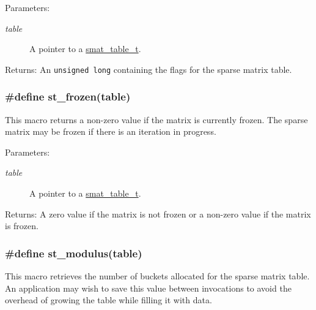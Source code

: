 \begin{Desc}
\item[Parameters:]
\begin{description}
\item[{\em table}]A pointer to a \hyperlink{group__dbprim__smat_a0}{smat\_\-table\_\-t}.\end{description}
\end{Desc}
\begin{Desc}
\item[Returns:]An {\tt unsigned long} containing the flags for the sparse matrix table. \end{Desc}
\hypertarget{group__dbprim__smat_a23}{
\subsubsection[st\_\-frozen]{\setlength{\rightskip}{0pt plus 5cm}\#define st\_\-frozen(table)}}
\label{group__dbprim__smat_a23}


This macro returns a non-zero value if the matrix is currently frozen. The sparse matrix may be frozen if there is an iteration in progress.

\begin{Desc}
\item[Parameters:]
\begin{description}
\item[{\em table}]A pointer to a \hyperlink{group__dbprim__smat_a0}{smat\_\-table\_\-t}.\end{description}
\end{Desc}
\begin{Desc}
\item[Returns:]A zero value if the matrix is not frozen or a non-zero value if the matrix is frozen. \end{Desc}
\hypertarget{group__dbprim__smat_a24}{
\subsubsection[st\_\-modulus]{\setlength{\rightskip}{0pt plus 5cm}\#define st\_\-modulus(table)}}
\label{group__dbprim__smat_a24}


This macro retrieves the number of buckets allocated for the sparse matrix table. An application may wish to save this value between invocations to avoid the overhead of growing the table while filling it with data.

